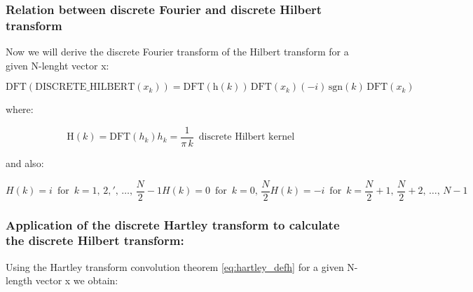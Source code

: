 \documentclass[12pt,twoside,a4paper]{article}
\numberwithin{equation}{subsection}
\numberwithin{figure}{subsection}
\begin{document}
\subsubsection*{Relation between discrete Fourier and discrete Hilbert transform}

Now we will derive the discrete Fourier transform of the Hilbert transform for a given N-lenght vector x:

\begin{equation} \label{eq:hartley_dfttheorem}
  \mathrm{DFT}(\mathrm{DISCRETE\_HILBERT}({x_{k}}))=\mathrm{DFT}(\mathrm{h}(k))\,\mathrm{DFT}({x_{k}}) (-
  i)\,\mathrm{sgn}(k)\,\mathrm{DFT}({x_{k}})
\end{equation}

where: 

\begin{subequations} \label{eq:hartley_dfttparams}
  \begin{equation}   \label{eq:hdfttps_bigh}
    \mathrm{H}(k) = \mathrm{DFT}({h_{k}})
  \end{equation}
  \begin{equation}   \label{eq:hdfttps_smallh}
    {h_{k}}=\frac {1}{\pi \,k}\,\mbox{ discrete Hilbert kernel }  
  \end{equation}
\end{subequations} 

and also: 

\begin{subequations} \label{eq:hartley_defh}
  \begin{equation}   \label{eq:hdefh_fhalf}
    H(k) = i \,\mbox{ for }\, k=1, \,2,',\,\ldots,\,\frac {N}{2} - 1
  \end{equation}
  \begin{equation}   \label{eq:hdefh_middle}
    H(k) = 0\,\mbox{ for }\,  k=0, \,\frac {N}{2}
  \end{equation}
  \begin{equation}   \label{eq:hdefh_shalf}
    H(k) = -i\, \mbox{ for } \,k=\frac {N}{2} + 1, \,\frac {N}{2} + 2,\,\ldots,\,N - 1
  \end{equation}
\end{subequations}

\subsubsection*{Application of the discrete Hartley transform to calculate the discrete Hilbert transform:}

Using the Hartley transform convolution theorem \ref{eq:hartley_defh} for a given N-length vector x we obtain:
\end{document}

